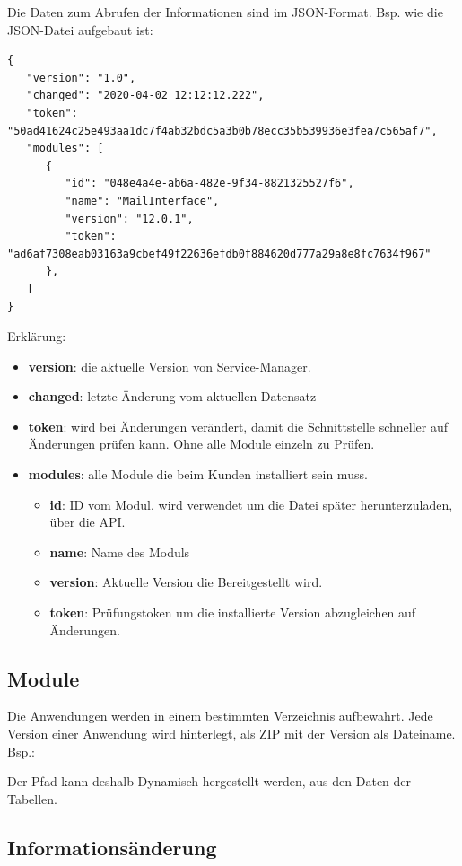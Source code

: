 \documentclass{article}
\begin{document}
Die Daten zum Abrufen der Informationen sind im JSON-Format. 
Bsp. wie die JSON-Datei aufgebaut ist:
\begin{verbatim}
{
   "version": "1.0",
   "changed": "2020-04-02 12:12:12.222",
   "token": "50ad41624c25e493aa1dc7f4ab32bdc5a3b0b78ecc35b539936e3fea7c565af7",
   "modules": [
      {
         "id": "048e4a4e-ab6a-482e-9f34-8821325527f6",
         "name": "MailInterface",
         "version": "12.0.1",
         "token": "ad6af7308eab03163a9cbef49f22636efdb0f884620d777a29a8e8fc7634f967"
      },
   ]
}
\end{verbatim}

Erklärung: 

\begin{itemize}
  \item \textbf{version}: die aktuelle Version von Service-Manager.
  \item \textbf{changed}: letzte Änderung vom aktuellen Datensatz
  \item \textbf{token}: wird bei Änderungen verändert, damit die Schnittstelle schneller auf Änderungen prüfen kann. Ohne alle Module einzeln zu Prüfen.
  \item \textbf{modules}: alle Module die beim Kunden installiert sein muss.
  \begin{itemize}
  	\item \textbf{id}: ID vom Modul, wird verwendet um die Datei später herunterzuladen, über die API.
  	\item \textbf{name}: Name des Moduls
  	\item \textbf{version}: Aktuelle Version die Bereitgestellt wird.
  	\item \textbf{token}: Prüfungstoken um die installierte Version abzugleichen auf Änderungen.
  \end{itemize}
\end{itemize}

\subsection{Module}

Die Anwendungen werden in einem bestimmten Verzeichnis aufbewahrt. Jede Version einer Anwendung wird hinterlegt, als ZIP mit der Version als Dateiname.
Bsp.: 

Der Pfad kann deshalb Dynamisch hergestellt werden, aus den Daten der Tabellen.

\subsection{Informationsänderung}
\end{document}
